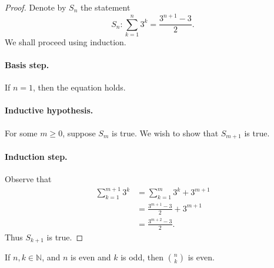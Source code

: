 \documentclass{exam}
\begin{document}
\begin{proof}
    Denote by $S_n$ the statement $$S_n: \sum_{k=1}^n3^k = \frac{3^{n+1}-3}2.$$ We shall proceed using induction.

    \paragraph{Basis step.} If $n=1$, then the equation holds.

    \paragraph{Inductive hypothesis.} For some $m\ge 0$, suppose $S_{m}$ is true. We wish to show that $S_{m+1}$ is true.

    \paragraph{Induction step.} Observe that
    \begin{align*}
        \sum_{k=1}^{m+1}3^k &= \sum_{k=1}^m3^k+3^{m+1}\\
        &=\frac{3^{m+1}-3}2 + 3^{m+1}\\
        &=\frac{3^{m+2}-3}2.
    \end{align*}
    Thus $S_{k+1}$ is true.
\end{proof}

\begin{proposition}{10.35}
    If $n,k\in\mathbb N$, and $n$ is even and $k$ is odd, then $\binom n k$ is even.
\end{proposition}
\end{document}
